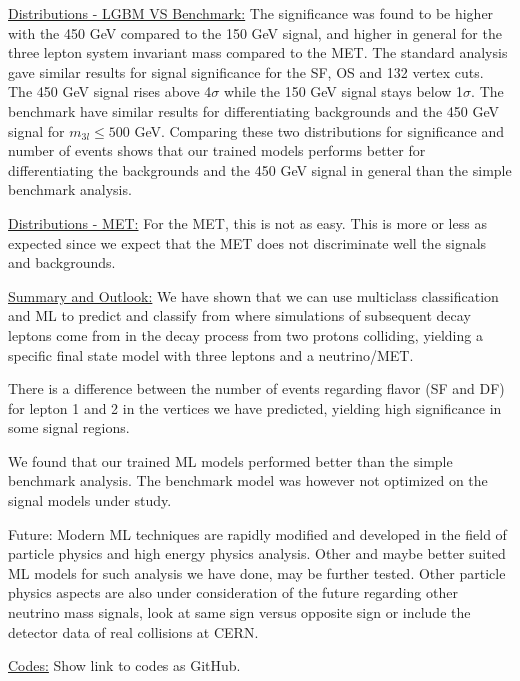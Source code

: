 \documentclass[a4paper, american, 12pt]{report}
\begin{document}
	
	\underline{Distributions - LGBM VS Benchmark:}
	The significance was found to be higher with the 450 GeV compared to the 150 GeV signal, and higher in general for the three lepton system invariant mass compared to the MET. The standard analysis gave similar results for signal significance for the SF, OS and 132 vertex cuts. The 450 GeV signal rises above 4$\sigma$ while the 150 GeV signal stays below 1$\sigma$. The benchmark have similar results for differentiating backgrounds and the 450 GeV signal for $m_{3l}\leq500$ GeV. Comparing these two distributions for significance and number of events shows that our trained models performs better for differentiating the backgrounds and the 450 GeV signal in general than the simple benchmark analysis.
	
	
	\underline{Distributions - MET:}
	For the MET, this is not as easy. This is more or less as expected since we expect that the MET does not discriminate well the signals and backgrounds.
	
	
	\underline{Summary and Outlook:}
	We have shown that we can use multiclass classification and ML to predict and classify from where simulations of subsequent decay leptons come from in the decay process from two protons colliding, yielding a specific final state model with three leptons and a neutrino/MET.
	
	There is a difference between the number of events regarding flavor (SF and DF) for lepton 1 and 2 in the vertices we have predicted, yielding high significance in some signal regions. 
	
	We found that our trained ML models performed better than the simple benchmark analysis. The benchmark model was however not optimized on the signal models under study.
	
	Future: Modern ML techniques are rapidly modified and developed in the field of particle physics and high energy physics analysis. Other and maybe better suited ML models for such analysis we have done, may be further tested. Other particle physics aspects are also under consideration of the future regarding other neutrino mass signals, look at same sign versus opposite sign or include the detector data of real collisions at CERN.
	

	\underline{Codes:}
	Show link to codes as GitHub.	
\end{document}
